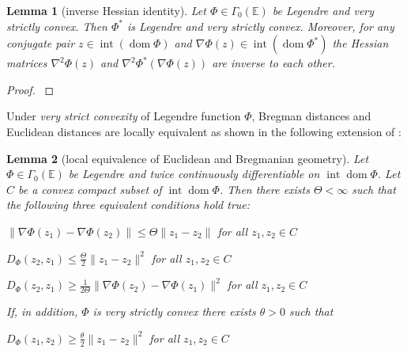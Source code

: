\documentclass[11pt,onecolumn]{article}
\DeclareMathOperator{\dom}{dom}
\DeclareMathOperator{\intr}{int}
\newtheorem{lemma}[lemma]{Lemma}
\theoremstyle{remark}
\begin{document}
\begin{lemma}[inverse Hessian identity] \label{thm:inverse_hessian}
Let $\Phi\in \Gamma_0(\mathbb{E})$ be Legendre and very strictly convex. Then $\Phi^*$ is Legendre and very strictly convex. Moreover, for any conjugate pair $z \in \intr(\dom\Phi)$ and $\nabla \Phi(z) \in \intr(\dom\Phi^*)$ the Hessian matrices $\nabla^2 \Phi(z)$ and $\nabla^2 \Phi^*(\nabla\Phi(z))$ are inverse to each other.
\end{lemma}
\begin{proof}
\cite[Lemma 1.18]{laude2021lower}
\end{proof}

Under \emph{very strict convexity} of Legendre function $\Phi$, Bregman distances and Euclidean distances are locally equivalent as shown in the following extension of \cite[Proposition 2.10]{bauschke2000dykstras}:
\begin{lemma}[local equivalence of Euclidean and Bregmanian geometry] \label{thm:very_strictly_convex}
    Let $\Phi\in \Gamma_0(\mathbb{E})$ be Legendre and twice continuously differentiable on $\intr\dom\Phi$. Let $C$ be a convex compact subset of $\intr \dom \Phi$. Then there exists $\Theta <\infty$ such that the following three equivalent conditions hold true:
    \begin{lemenum}
        \item $\|\nabla \Phi(z_1) - \nabla\Phi(z_2)\| \leq \Theta\|z_1 -z_2\|$ for all $z_1,z_2 \in C$ \label{thm:very_strictly_convex:lip}
        \item $D_\Phi(z_2, z_1) \leq \tfrac{\Theta}{2}\|z_1-z_2\|^2$ for all $z_1,z_2 \in C$ \label{thm:very_strictly_convex:descent}
        \item $D_\Phi(z_2, z_1) \geq \tfrac{1}{2\Theta}\|\nabla \Phi(z_2)-\nabla \Phi(z_1)\|^2$ for all $z_1,z_2 \in C$ \label{thm:very_strictly_convex:coco}
    \end{lemenum}
    If, in addition, $\Phi$ is very strictly convex there exists $\theta >0$ such that
    \begin{lemenum}[resume]
        \item $D_\Phi(z_1,z_2) \geq \tfrac{\theta}{2} \|z_1-z_2\|^2$ for all $z_1,z_2 \in C$ \label{thm:very_strictly_convex:strong}
    \end{lemenum}
\end{lemma}
\end{document}
